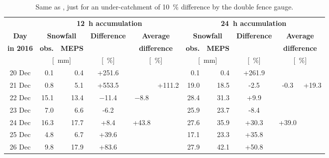 \begin{table}[t]
	\begin{center}
		\caption{Same as , just for an under-catchment of \SI{10}{\percent} difference by the double fence gauge. }\label{tab:res:MEPS_err_10}
		\begin{tabular}{c||r|r|c|c|c||r|r|c|c|c}
			\hline \hline
			& \multicolumn{5}{c||}{\textbf{\SI{12}{\hour} accumulation}} & \multicolumn{5}{c}{\textbf{\SI{24}{\hour} accumulation}}    \\ \cline{2-11}
			\textbf{Day} & \multicolumn{2}{c|}{\textbf{Snowfall}} & \textbf{Difference} & \multicolumn{2}{c||}{\textbf{Average}} &  \multicolumn{2}{c|}{\textbf{Snowfall}} & \textbf{Difference} & \multicolumn{2}{c}{\textbf{Average}}  \\\cline{2-3} \cline{7-8}
			\textbf{in 2016} & \textbf{obs.} & \textbf{MEPS} & & \multicolumn{2}{c||}{\textbf{difference}} & \textbf{obs.} & \textbf{MEPS} & & \multicolumn{2}{c}{\textbf{difference}} \\\cline{2-11}
			& \multicolumn{2}{c|}{[\SI{}{\mm}]} & [\SI{}{\percent}] & \multicolumn{2}{c||}{ [\SI{}{\percent}]} & \multicolumn{2}{c|}{[\SI{}{\mm}]} & [\SI{}{\percent}] & \multicolumn{2}{c}{ [\SI{}{\percent}]} \\ \hline\hline
			\num{20} Dec & \num{0.1} &\num{0.4} & +\num{251.6} & & &\num{0.1} & \num{0.4} & +\num{261.9} & & \\\cline{1-11}
			\num{21} Dec & \num{0.8} & \num{5.1} & +\num{553.5} &  &\multirow{6}{*}{+\num{111.2}} & \num{19.0} & \num{18.5} & -\num{2.5} & \multirow{3}{*}{-\num{0.3}}& \multirow{6}{*}{+\num{19.3}}   \\\cline{1-5}\cline{7-9} 
			\num{22} Dec & \num{15.1} & \num{13.4} & \num{-11.4} & \multirow{2}{*}{\num{-8.8}} & & \num{28.4} & \num{31.3} & +\num{9.9} &  &  \\\cline{1-4}\cline{7-9}
			\num{23} Dec & \num{7.0} & \num{6.6} & -\num{6.2} & & & \num{25.9} & \num{23.7} & -\num{8.4} &  &  \\\cline{1-5}\cline{7-10}
			\num{24} Dec & \num{16.3} & \num{17.7} & +\num{8.4} & \multirow{3}{*}{+\num{43.8}} & & \num{27.6} & \num{35.9} & +\num{30.3} & \multirow{3}{*}{+\num{39.0}}  &  \\\cline{1-4}\cline{7-9}
			\num{25} Dec & \num{4.8} & \num{6.7} & +\num{39.6} & & & \num{17.1} & \num{23.3} & +\num{35.8} & &   \\\cline{1-4}\cline{7-9}
			\num{26} Dec & \num{9.8} & \num{17.9} & +\num{83.6} & & & \num{27.9} & \num{42.1} & +\num{50.8} &  &  \\\hline\hline
		\end{tabular}
	\end{center}
\end{table}
